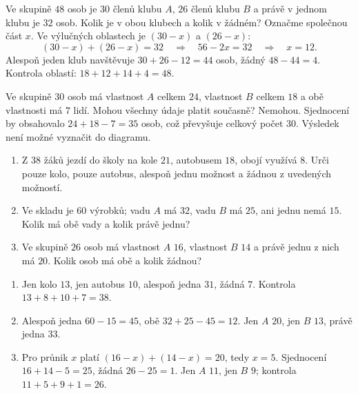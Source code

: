 \documentclass[11pt,a4paper]{article}
\begin{document}


\begin{zadaniReseniBox}[title={Rozšíření 1}]
Ve skupině $48$ osob je $30$ členů klubu $A$, $26$ členů klubu $B$
a právě v jednom klubu je $32$ osob. Kolik je v obou klubech a kolik v žádném?
\tcblower
Označme společnou část $x$. Ve výlučných oblastech je $(30-x)$ a $(26-x)$:
\[
(30-x)+(26-x)=32\quad\Rightarrow\quad 56-2x=32\quad\Rightarrow\quad x=12.
\]
Alespoň jeden klub navštěvuje $30+26-12=44$ osob, žádný $48-44=4$.
Kontrola oblastí: $18+12+14+4=48$.
\end{zadaniReseniBox}
\begin{zadaniReseniBox}[title={Rozšíření 2},breakable=false]
Ve skupině $30$ osob má vlastnost $A$ celkem $24$,
vlastnost $B$ celkem $18$ a obě vlastnosti má $7$ lidí.
Mohou všechny údaje platit současně?
\tcblower
Nemohou. Sjednocení by obsahovalo $24+18-7=35$ osob,
což převyšuje celkový počet $30$. Výsledek není možné vyznačit do diagramu.
\end{zadaniReseniBox}

\begin{zadaniReseniBox}[title={Domácí úkol}]
\begin{enumerate}[label=\alph*)]
\item Z $38$ žáků jezdí do školy na kole $21$, autobusem $18$,
obojí využívá $8$. Urči pouze kolo, pouze autobus, alespoň jednu
možnost a žádnou z uvedených možností.
\item Ve skladu je $60$ výrobků; vadu $A$ má $32$, vadu $B$ má $25$,
ani jednu nemá $15$. Kolik má obě vady a kolik právě jednu?
\item Ve skupině $26$ osob má vlastnost $A$ $16$, vlastnost $B$ $14$
a právě jednu z nich má $20$. Kolik osob má obě a kolik žádnou?
\end{enumerate}
\tcblower
\begin{enumerate}[label=\alph*)]
\item Jen kolo $13$, jen autobus $10$, alespoň jedna $31$, žádná $7$.
Kontrola $13+8+10+7=38$.
\item Alespoň jedna $60-15=45$, obě $32+25-45=12$.
Jen $A$ $20$, jen $B$ $13$, právě jedna $33$.
\item Pro průnik $x$ platí $(16-x)+(14-x)=20$, tedy $x=5$.
Sjednocení $16+14-5=25$, žádná $26-25=1$.
Jen $A$ $11$, jen $B$ $9$; kontrola $11+5+9+1=26$.
\end{enumerate}
\end{zadaniReseniBox}
\end{document}
